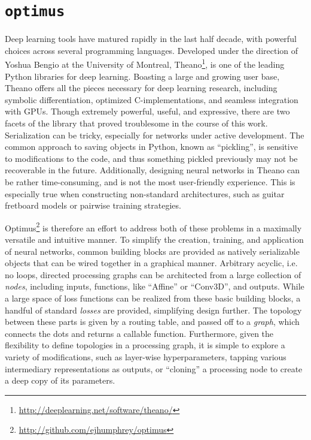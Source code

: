 \section{\texttt{optimus}}
\label{sec:optimus}

Deep learning tools have matured rapidly in the last half decade, with powerful choices across several programming languages.
Developed under the direction of Yoshua Bengio at the University of Montreal, Theano\footnote{\url{http://deeplearning.net/software/theano/}}, is one of the leading Python libraries for deep learning.
Boasting a large and growing user base, Theano offers all the pieces necessary for deep learning research, including symbolic differentiation, optimized C-implementations, and seamless integration with GPUs.
Though extremely powerful, useful, and expressive, there are two facets of the library that proved troublesome in the course of this work.
Serialization can be tricky, especially for networks under active development.
The common approach to saving objects in Python, known as ``pickling'', is sensitive to modifications to the code, and thus something pickled previously may not be recoverable in the future.
Additionally, designing neural networks in Theano can be rather time-consuming, and is not the most user-friendly experience.
This is especially true when constructing non-standard architectures, such as guitar fretboard models or pairwise training strategies.

Optimus\footnote{\url{http://github.com/ejhumphrey/optimus}} is therefore an effort to address both of these problems in a maximally versatile and intuitive manner.
To simplify the creation, training, and application of neural networks, common building blocks are provided as natively serializable objects that can be wired together in a graphical manner.
Arbitrary acyclic, i.e. no loops, directed processing graphs can be architected from a large collection of \emph{nodes}, including inputs, functions, like ``Affine'' or ``Conv3D'', and outputs.
While a large space of loss functions can be realized from these basic building blocks, a handful of standard \emph{losses} are provided, simplifying design further.
The topology between these parts is given by a routing table, and passed off to a \emph{graph}, which connects the dots and returns a callable function.
Furthermore, given the flexibility to define topologies in a processing graph, it is simple to explore a variety of modifications, such as layer-wise hyperparameters, tapping various intermediary representations as outputs, or ``cloning'' a processing node to create a deep copy of its parameters.

